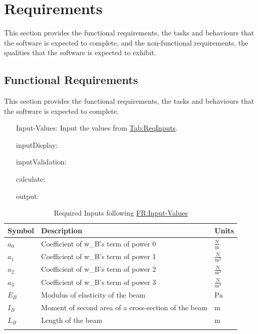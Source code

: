 \documentclass[12pt]{article}
\begin{document}
\section{Requirements}
\label{Sec:Requirements}
This section provides the functional requirements, the tasks and behaviours that the software is expected to complete, and the non-functional requirements, the qualities that the software is expected to exhibit.

\subsection{Functional Requirements}
\label{Sec:FRs}
This section provides the functional requirements, the tasks and behaviours that the software is expected to complete.

\begin{itemize}
\item[Input-Values:\phantomsection\label{inputValues}]{Input the values from \hyperref[Table:ReqInputs]{Tab:ReqInputs}.}
\item[inputDisplay:\phantomsection\label{inputDisplay}]{}
\item[inputValidation:\phantomsection\label{inputValidation}]{}
\item[calculate:\phantomsection\label{calculate}]{}
\item[output:\phantomsection\label{output}]{}
\end{itemize}
\begin{longtabu}{l X[l] l}
\toprule
\textbf{Symbol} & \textbf{Description} & \textbf{Units}
\\
\midrule
\endhead
${a_{\text{0}}}$ & Coefficient of w\_B's term of power 0 & $\frac{\text{N}}{\text{m}}$
\\
${a_{\text{1}}}$ & Coefficient of w\_B's term of power 1 & $\frac{\text{N}}{\text{m}^{2}}$
\\
${a_{\text{2}}}$ & Coefficient of w\_B's term of power 2 & $\frac{\text{N}}{\text{m}^{3}}$
\\
${a_{\text{3}}}$ & Coefficient of w\_B's term of power 3 & $\frac{\text{N}}{\text{m}^{4}}$
\\
${E_{B}}$ & Modulus of elasticity of the beam & ${\text{Pa}}$
\\
${I_{B}}$ & Moment of second area of a cross-section of the beam & ${\text{m}}$
\\
${L_{B}}$ & Length of the beam & ${\text{m}}$
\\
\bottomrule
\caption{Required Inputs following \hyperref[inputValues]{FR:Input-Values}}
\label{Table:ReqInputs}
\end{longtabu}
\end{document}
